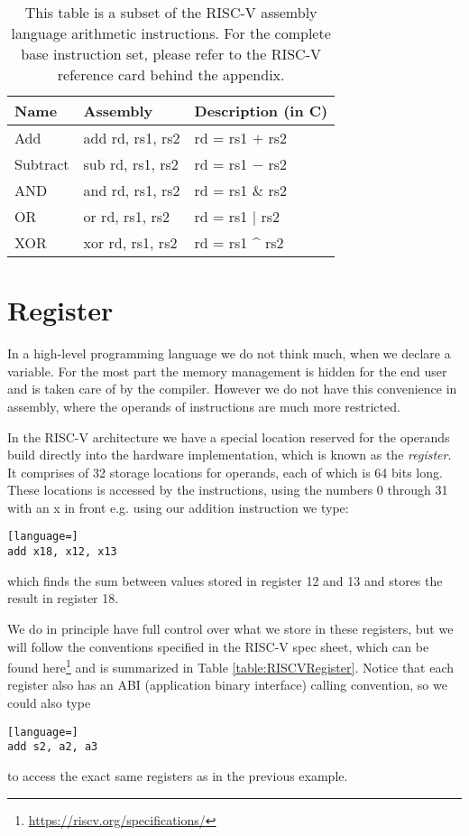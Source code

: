     \begin{table}[h!]
        \centering
        \begin{tabular}{|l|l|l|}
        	\hline
        	Name     & Assembly         & Description (in C) \\ \hline
        	Add      & add rd, rs1, rs2 & rd = rs1 $+$ rs2   \\
        	Subtract & sub rd, rs1, rs2 & rd = rs1 $-$ rs2   \\
        	AND      & and rd, rs1, rs2 & rd = rs1 \& rs2    \\
        	OR       & or rd, rs1, rs2  & rd = rs1 $|$ rs2   \\
        	XOR      & xor rd, rs1, rs2 & rd = rs1 \^{} rs2  \\ \hline
        \end{tabular}
        \caption{This table is a subset of the RISC-V assembly language arithmetic instructions. For the complete base instruction set, please refer to the RISC-V reference card behind the appendix.}
        \label{table:RISCVInstructions}
    \end{table}

\section{Register}\label{section:Register}
    In a high-level programming language we do not think much, when we declare a variable. For the most part the memory management is hidden for the end user and is taken care of by the compiler. However we do not have this convenience in assembly, where the operands of instructions are much more restricted. 
    
    In the RISC-V architecture we have a special location reserved for the operands build directly into the hardware implementation, which is known as the \textit{register}. It comprises of 32 storage locations for operands, each of which is 64 bits long. These locations is accessed by the instructions, using the numbers 0 through 31 with an x in front e.g. using our addition instruction we type:
    \begin{lstlisting}[language=]
add x18, x12, x13
    \end{lstlisting}
     which finds the sum between values stored in register 12 and 13 and stores the result in register 18.
     
     We do in principle have full control over what we store in these registers, but we will follow the conventions specified in the RISC-V spec sheet, which can be found here\footnote{\url{https://riscv.org/specifications/}} and is summarized in Table \ref{table:RISCVRegister}. Notice that each register also has an ABI (application binary interface) calling convention, so we could also type
     \begin{lstlisting}[language=]
add s2, a2, a3
     \end{lstlisting}
     to access the exact same registers as in the previous example.
     
